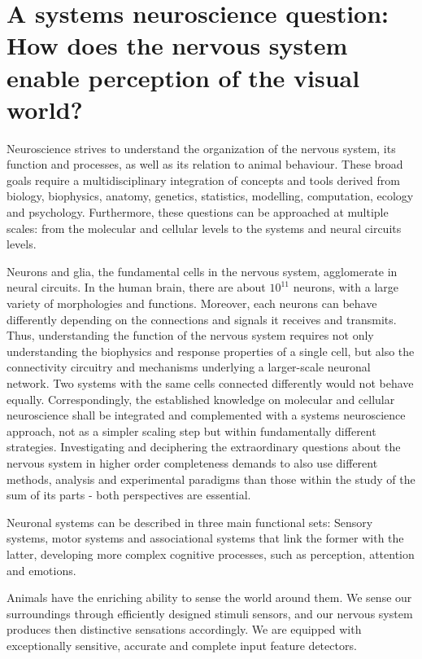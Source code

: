 \section{A systems neuroscience question: How does the nervous system enable perception of the visual world?}
\label{sec:int_motivation}

Neuroscience strives to understand the organization of the nervous system, its function and processes, as well as its relation to animal behaviour. These broad goals require a multidisciplinary integration of concepts and tools derived from biology, biophysics, anatomy, genetics, statistics, modelling, computation, ecology and psychology. Furthermore, these questions can be approached at multiple scales: from the molecular and cellular levels to the systems and neural circuits levels.

Neurons and glia, the fundamental cells in the nervous system, agglomerate in neural circuits. In the human brain, there are about $10^{11}$ neurons, with a large variety of morphologies and functions. Moreover, each neurons can behave differently depending on the connections and signals it receives and transmits. 
Thus, understanding the function of the nervous system requires not only understanding the biophysics and response properties of a single cell, but also the connectivity circuitry and mechanisms underlying a larger-scale neuronal network. Two systems with the same cells connected differently would not behave equally. Correspondingly, the established knowledge on molecular and cellular neuroscience shall be integrated and complemented with a systems neuroscience approach, not as a simpler scaling step but within fundamentally different strategies. Investigating and deciphering the extraordinary questions about the nervous system in higher order completeness demands to also use different methods, analysis and experimental paradigms than those within the study of the sum of its parts - both perspectives are essential.

Neuronal systems can be described in three main functional sets: Sensory systems, motor systems and associational systems that link the former with the latter, developing more complex cognitive processes, such as perception, attention and emotions.

Animals have the enriching ability to sense the world around them. We sense our surroundings through efficiently designed stimuli sensors, and our nervous system produces then distinctive sensations accordingly. We are equipped with exceptionally sensitive, accurate and complete input feature detectors.

